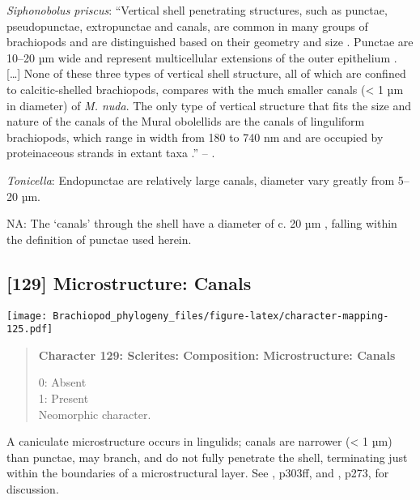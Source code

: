 \documentclass[openany]{book}
\theoremstyle{definition}
\theoremstyle{definition}
\theoremstyle{definition}
\theoremstyle{remark}
\begin{document}
\hypertarget{Siphonobolus_priscus-coding-128}{}
\emph{Siphonobolus priscus}: ``Vertical shell penetrating structures,
such as punctae, pseudopunctae, extropunctae and canals, are common in
many groups of brachiopods and are distinguished based on their geometry
and size \citep{Williams1997Introduction}. Punctae are 10--20 µm wide
and represent multicellular extensions of the outer epithelium
\citep{Owen1969Thecaecum}. {[}\ldots{}{]} None of these three types of
vertical shell structure, all of which are confined to calcitic-shelled
brachiopods, compares with the much smaller canals (\textless{} 1 µm in
diameter) of \emph{M. nuda}. The only type of vertical structure that
fits the size and nature of the canals of the Mural obolellids are the
canals of linguliform brachiopods, which range in width from 180 to 740
nm and are occupied by proteinaceous strands in extant taxa
\citetext{\citealp[1994]{Williams1992Structureof}; \citealp{Williams1997Introduction}}.''
-- \citet{Balthasar2008iMummpikia}.

\hypertarget{Tonicella-coding-128}{}
\emph{Tonicella}: Endopunctae are relatively large canals, diameter vary
greatly from 5--20 µm.

\hypertarget{NA-coding-128}{}
NA: The `canals' through the shell have a diameter of c. 20 µm
\citep[text-fig. 2a]{Williams2004Chemicostructure}, falling within the
definition of punctae used herein.

\subsection*{{[}129{]} Microstructure:
Canals}\label{microstructure-canals}

\texttt{[image: Brachiopod\_phylogeny\_files/figure-latex/character-mapping-125.pdf]}

\begin{quote}
\textbf{Character 129: Sclerites: Composition: Microstructure: Canals}

0: Absent\\
1: Present\\
Neomorphic character.
\end{quote}

A caniculate microstructure occurs in lingulids; canals are narrower
(\textless{} 1 µm) than punctae, may branch, and do not fully penetrate
the shell, terminating just within the boundaries of a microstructural
layer. See \citet{Williams1997Introduction}, p303ff, and
\citet{Balthasar2008iMummpikia}, p273, for discussion.
\end{document}
